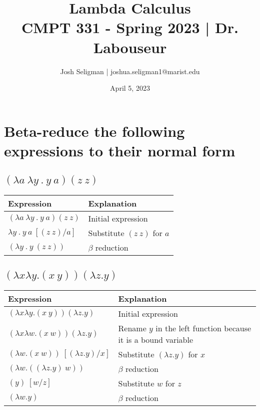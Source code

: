 \documentclass[letterpaper, 10pt, DIV=13]{scrartcl}
\title {
	\normalfont
	\huge{Lambda Calculus} \\
	\vspace{10pt}
	\large{CMPT 331 - Spring 2023 | Dr. Labouseur}
}
\author{\normalfont Josh Seligman | joshua.seligman1@marist.edu}
\date{\normalfont April 5, 2023}
\numberwithin{equation}{section}
\numberwithin{figure}{section}
\numberwithin{table}{section}
\begin{document}
\maketitle

\section{Beta-reduce the following expressions to their normal form}
\subsection{$(\lambda a~\lambda y~.~y~a) (z~z)$}
\begin{center}
\begin{tabularx}{\textwidth}{|Y|Y|}
    \hline
    Expression & Explanation \\
    \hline
    $(\lambda a~\lambda y~.~y~a) (z~z)$ & Initial expression \\
    \hline
    $\lambda y~.~y~a~[(z~z) / a]$ & Substitute $(z~z)$ for $a$ \\
    \hline
    $(\lambda y~.~y~(z~z))$ & $\beta$ reduction \\
    \hline
\end{tabularx}
\end{center}

\subsection{$(\lambda x \lambda y.(x~y))(\lambda z.y)$}
\begin{center}
\begin{tabularx}{\textwidth}{|Y|Y|}
    \hline
    Expression & Explanation \\
    \hline
    $(\lambda x \lambda y.(x~y))(\lambda z.y)$ & Initial expression \\
    \hline
    $(\lambda x \lambda w.(x~w))(\lambda z.y)$ & Rename $y$ in the left function because it is a bound variable \\
    \hline
    $(\lambda w.(x~w))~[(\lambda z.y) / x]$ & Substitute $(\lambda z.y)$ for $x$ \\
    \hline
    $(\lambda w.((\lambda z.y)~w))$ & $\beta$ reduction \\
    \hline
    $(y)~[w / z]$ & Substitute $w$ for $z$ \\
    \hline
    $(\lambda w.y)$ & $\beta$ reduction \\
    \hline
\end{tabularx}
\end{center}
\end{document}
